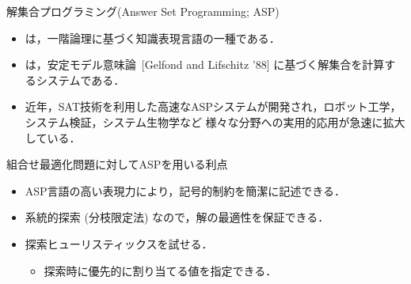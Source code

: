 \documentclass[11pt,dvipdfmx,handout]{beamer}
\begin{document}
\begin{frame}{解集合プログラミング(Answer Set Programming; ASP)}
  \begin{itemize}
  \item {}は，一階論理に基づく知識表現言語の一種である．
  \item {}は，安定モデル意味論~[Gelfond and Lifschitz '88]
    に基づく解集合を計算するシステムである．
  \item 近年，SAT技術を利用した高速なASPシステムが開発され，ロボット工学，
    システム検証，システム生物学など
    様々な分野への実用的応用が急速に拡大している．
  \end{itemize}
  \begin{alertblock}{組合せ最適化問題に対してASPを用いる利点}
    \begin{itemize}
    \item ASP言語の高い表現力により，記号的制約を簡潔に記述できる．
    \item 系統的探索 (分枝限定法) なので，解の最適性を保証できる．
    \item 探索ヒューリスティックスを試せる．
      \begin{itemize}
      \item 探索時に優先的に割り当てる値を指定できる．
      \end{itemize}
    \end{itemize}
  \end{alertblock}
\end{frame}
\end{document}
